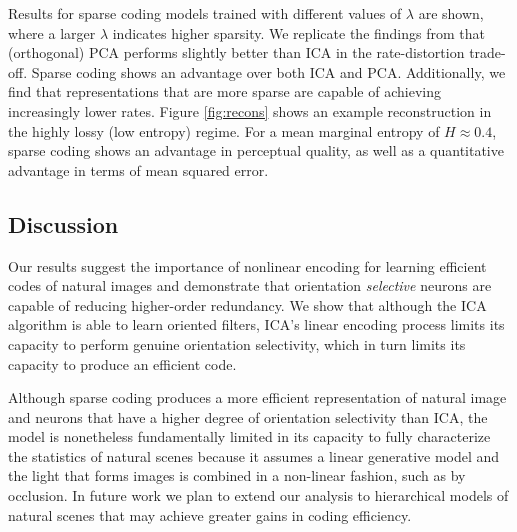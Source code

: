 
Results for sparse coding models trained with different values of $\lambda$ are shown, where a larger $\lambda$ indicates higher sparsity. We replicate the findings from  that (orthogonal) PCA  performs slightly better than ICA in the rate-distortion trade-off. Sparse coding shows an advantage over both ICA and PCA. Additionally, we find that representations that are more sparse are capable of achieving increasingly lower rates.
Figure \ref{fig:recons} shows an example reconstruction in the highly lossy (low entropy) regime. For a mean marginal entropy of $H\approx 0.4$, sparse coding shows an advantage in perceptual quality, as well as a quantitative advantage in terms of mean squared error.



\subsection{Discussion}
Our results suggest the importance of nonlinear encoding for learning efficient codes of natural images and demonstrate that orientation \textit{selective} neurons are capable of reducing higher-order redundancy. We show that although the ICA algorithm is able to learn oriented filters, ICA's linear encoding process limits its capacity to perform genuine orientation selectivity, which in turn limits its capacity to produce an efficient code. 

Although sparse coding produces a more efficient representation of natural image and neurons that have a higher degree of orientation selectivity than ICA, the model is nonetheless fundamentally limited in its capacity to fully characterize the statistics of natural scenes because it assumes a linear generative model and the light that forms images is combined in a non-linear fashion, such as by occlusion. In future work we plan to extend our analysis to hierarchical models of natural scenes that may achieve greater gains in coding efficiency.

